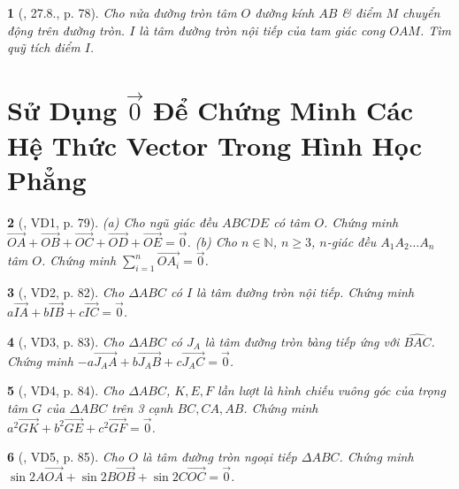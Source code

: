 \documentclass{article}
\newtheorem{baitoan}{}
\begin{document}
\begin{baitoan}[\cite{Hai_Hung_Thu_Tung_ncpt_Toan_10_tap_2}, 27.8., p. 78]
	Cho nửa đường tròn tâm $O$ đường kính $AB$ \& điểm $M$ chuyển động trên đường tròn. $I$ là tâm đường tròn nội tiếp của tam giác cong $OAM$. Tìm quỹ tích điểm $I$.
\end{baitoan}


\section{Sử Dụng $\vec{0}$ Để Chứng Minh Các Hệ Thức Vector Trong Hình Học Phẳng}

\begin{baitoan}[\cite{Hai_Hung_Thu_Tung_ncpt_Toan_10_tap_2}, VD1, p. 79]
	(a) Cho ngũ giác đều $ABCDE$ có tâm $O$. Chứng minh $\overrightarrow{OA} + \overrightarrow{OB} + \overrightarrow{OC} + \overrightarrow{OD} + \overrightarrow{OE} = \vec{0}$. (b) Cho $n\in\mathbb{N}$, $n\ge3$, $n$-giác đều $A_1A_2\ldots A_n$ tâm $O$. Chứng minh $\sum_{i=1}^n \overrightarrow{OA_i} = \vec{0}$.
\end{baitoan}

\begin{baitoan}[\cite{Hai_Hung_Thu_Tung_ncpt_Toan_10_tap_2}, VD2, p. 82]
	Cho $\Delta ABC$ có $I$ là tâm đường tròn nội tiếp. Chứng minh $a\overrightarrow{IA} + b\overrightarrow{IB} + c\overrightarrow{IC} = \vec{0}$.
\end{baitoan}

\begin{baitoan}[\cite{Hai_Hung_Thu_Tung_ncpt_Toan_10_tap_2}, VD3, p. 83]
	Cho $\Delta ABC$ có $J_A$ là tâm đường tròn bàng tiếp ứng với $\widehat{BAC}$. Chứng minh $-a\overrightarrow{J_AA} + b\overrightarrow{J_AB} + c\overrightarrow{J_AC} = \vec{0} $.
\end{baitoan}

\begin{baitoan}[\cite{Hai_Hung_Thu_Tung_ncpt_Toan_10_tap_2}, VD4, p. 84]
	Cho $\Delta ABC$, $K,E,F$ lần lượt là hình chiếu vuông góc của trọng tâm $G$ của $\Delta ABC$ trên 3 cạnh $BC,CA,AB$. Chứng minh $a^2\overrightarrow{GK} + b^2\overrightarrow{GE} + c^2\overrightarrow{GF} = \vec{0}$.
\end{baitoan}

\begin{baitoan}[\cite{Hai_Hung_Thu_Tung_ncpt_Toan_10_tap_2}, VD5, p. 85]
	Cho $O$ là tâm đường tròn ngoại tiếp $\Delta ABC$. Chứng minh $\sin2A\overrightarrow{OA} + \sin2B\overrightarrow{OB} + \sin2C\overrightarrow{OC} = \vec{0}$.
\end{baitoan}
\end{document}

